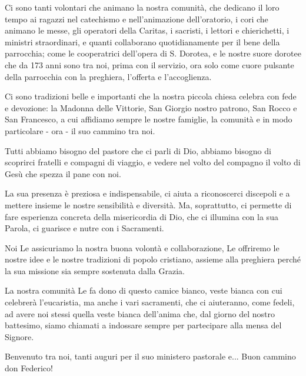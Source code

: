 Ci sono tanti volontari che animano la nostra comunità, che dedicano il loro tempo ai ragazzi nel catechismo e nell’animazione dell’oratorio, i cori che animano le messe, gli operatori della Caritas, i sacristi, i lettori e chierichetti, i ministri straordinari, e quanti collaborano quotidianamente per il bene della parrocchia; come le cooperatrici dell’opera di S. Dorotea, e le nostre suore dorotee che da 173 anni sono tra noi, prima con il servizio, ora solo come cuore pulsante della parrocchia con la preghiera, l’offerta e l’accoglienza.

Ci sono tradizioni belle e importanti che la nostra piccola chiesa celebra con fede e devozione: la Madonna delle Vittorie, San Giorgio nostro patrono, San Rocco e San Francesco, a cui affidiamo sempre le nostre famiglie, la comunità e in modo particolare - ora - il suo cammino tra noi. 

Tutti abbiamo bisogno del pastore che ci parli di Dio, abbiamo bisogno di scoprirci fratelli e compagni di viaggio, e vedere nel volto del compagno il volto di Gesù che spezza il pane con noi.

La sua presenza è preziosa e indispensabile, ci aiuta a riconoscerci discepoli e a mettere insieme le nostre sensibilità e diversità. Ma, soprattutto, ci permette di fare esperienza concreta della misericordia di Dio, che ci illumina con la sua Parola, ci guarisce e nutre con i Sacramenti.

Noi Le assicuriamo la nostra buona volontà e collaborazione, Le offriremo le nostre idee e le nostre tradizioni di popolo cristiano, assieme alla preghiera perché la sua missione sia sempre sostenuta dalla Grazia.

La nostra comunità Le fa dono di questo camice bianco, veste bianca con cui celebrerà l’eucaristia, ma anche i vari sacramenti, che ci aiuteranno, come fedeli, ad avere noi stessi quella veste bianca dell’anima che, dal giorno del nostro battesimo, siamo chiamati a indossare sempre per partecipare alla mensa del Signore.

Benvenuto tra noi, tanti auguri per il suo ministero pastorale e...
Buon cammino don Federico!

